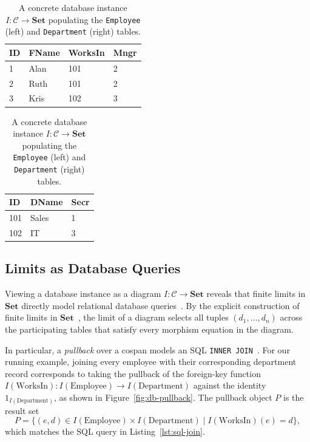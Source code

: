 \begin{table}[tb]
  \centering
  \begin{minipage}[t]{0.52\textwidth}
    \centering
    \begin{tabular}{@{}llll@{}}
      \toprule
      \textbf{ID} & \textbf{FName} & \textbf{WorksIn} & \textbf{Mngr} \\
      \midrule
      1 & Alan & 101 & 2 \\
      2 & Ruth & 101 & 2 \\
      3 & Kris & 102 & 3 \\
      \bottomrule
    \end{tabular}
  \end{minipage}
  \hfill
  \begin{minipage}[t]{0.42\textwidth}
    \centering
    \begin{tabular}{@{}lll@{}}
      \toprule
      \textbf{ID} & \textbf{DName} & \textbf{Secr} \\
      \midrule
      101 & Sales & 1 \\
      102 & IT & 3 \\
      \bottomrule
    \end{tabular}
  \end{minipage}
  \caption{A concrete database instance $I \colon \mathcal{C} \to \mathbf{Set}$ populating the \texttt{Employee} (left) and \texttt{Department} (right) tables.}
  \label{tab:db-instance}
\end{table}

\subsection{Limits as Database Queries}
\label{sec:db-queries}

Viewing a database instance as a diagram $I \colon \mathcal{C} \to \mathbf{Set}$ reveals that finite limits in $\mathbf{Set}$ directly model relational database queries~\cite[Sec.~3.5.3]{FongSpivak19}. By the explicit construction of finite limits in $\mathbf{Set}$~\cite[Thm.~3.80]{FongSpivak19}, the limit of a diagram selects all tuples $(d_1, \dots, d_n)$ across the participating tables that satisfy every morphism equation in the diagram.

In particular, a \emph{pullback} over a cospan models an SQL \texttt{INNER JOIN}~\cite[Ex.~3.84]{FongSpivak19}. For our running example, joining every employee with their corresponding department record corresponds to taking the pullback of the foreign-key function $I(\mathrm{WorksIn}) \colon I(\mathrm{Employee}) \to I(\mathrm{Department})$ against the identity $1_{I(\mathrm{Department})}$, as shown in Figure~\ref{fig:db-pullback}. The pullback object $P$ is the result set
\[
  P = \{(e, d) \in I(\mathrm{Employee}) \times I(\mathrm{Department})
        \mid I(\mathrm{WorksIn})(e) = d\},
\]
which matches the SQL query in Listing~\ref{lst:sql-join}.

